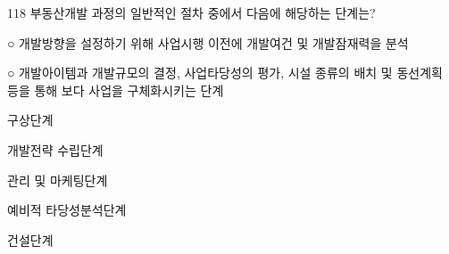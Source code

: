 \begin{question}{118}
부동산개발 과정의 일반적인 절차 중에서 다음에 해당하는 단계는?
\begin{framedtext}
○ 개발방향을 설정하기 위해 사업시행 이전에 개발여건 및 개발잠재력을 분석 \par
○ 개발아이템과 개발규모의 결정, 사업타당성의 평가, 시설 종류의 배치 및 동선계획 등을 통해 보다 사업을 구체화시키는 단계
\end{framedtext}
\begin{choices}
  \item 구상단계
  \item 개발전략 수립단계
  \item 관리 및 마케팅단계
  \item 예비적 타당성분석단계
  \item 건설단계
\end{choices}
\end{question}
